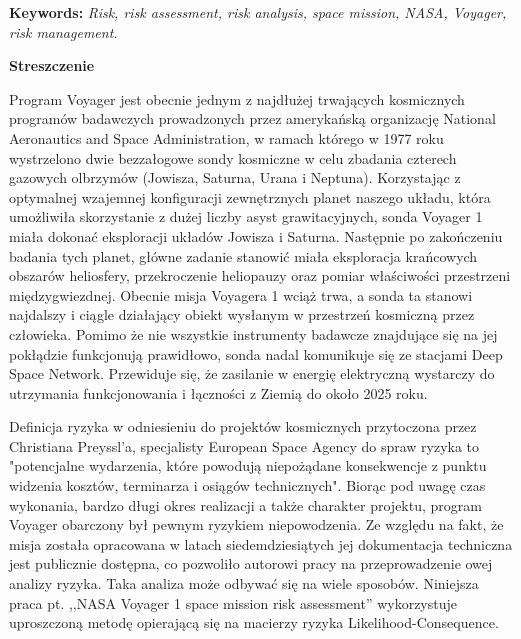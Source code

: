 \vspace*{\baselineskip}

\noindent\textbf{Keywords:} \textit{Risk, risk assessment, risk analysis, space mission, NASA, Voyager, risk management.}
\newpage

\begin{center}
\textbf{Streszczenie}
\end{center}

Program Voyager jest obecnie jednym z najdłużej trwających kosmicznych programów badawczych prowadzonych przez amerykańską organizację National Aeronautics and Space Administration, w ramach którego w 1977 roku wystrzelono dwie bezzałogowe sondy kosmiczne w celu zbadania czterech gazowych olbrzymów (Jowisza, Saturna, Urana i Neptuna). Korzystając z optymalnej wzajemnej konfiguracji zewnętrznych planet naszego układu, która umożliwiła skorzystanie z dużej liczby asyst grawitacyjnych, sonda Voyager 1 miała dokonać eksploracji układów Jowisza i Saturna. Następnie po zakończeniu badania tych planet, główne zadanie stanowić miała eksploracja krańcowych obszarów heliosfery, przekroczenie heliopauzy oraz pomiar właściwości przestrzeni międzygwiezdnej. Obecnie misja Voyagera 1 wciąż trwa, a sonda ta stanowi najdalszy i ciągle działający obiekt wysłanym w przestrzeń kosmiczną przez człowieka. Pomimo że nie wszystkie instrumenty badawcze znajdujące się na jej pokłądzie funkcjonują prawidłowo, sonda nadal komunikuje się ze stacjami Deep Space Network. Przewiduje się, że zasilanie w energię elektryczną wystarczy do utrzymania funkcjonowania i łączności z Ziemią do około 2025 roku.

Definicja ryzyka w odniesieniu do projektów kosmicznych przytoczona przez Christiana Preyssl'a, specjalisty European Space Agency do spraw ryzyka to "potencjalne wydarzenia, które powodują niepożądane konsekwencje z punktu widzenia kosztów, terminarza i osiągów technicznych". Biorąc pod uwagę czas wykonania, bardzo długi okres realizacji a także charakter projektu, program Voyager obarczony był pewnym ryzykiem niepowodzenia. Ze względu na fakt, że misja została opracowana w latach siedemdziesiątych jej dokumentacja techniczna jest publicznie dostępna, co pozwoliło autorowi pracy na przeprowadzenie owej analizy ryzyka. Taka analiza może odbywać się na wiele sposobów. Niniejsza praca pt. ,,NASA Voyager 1 space mission risk assessment'' wykorzystuje uproszczoną metodę opierającą się na macierzy ryzyka Likelihood-Consequence. 

